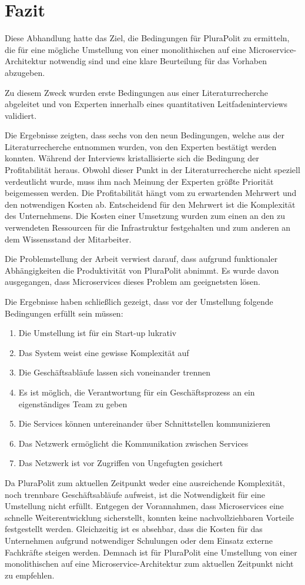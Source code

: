 \section{Fazit}

Diese Abhandlung hatte das Ziel, die Bedingungen für PluraPolit zu ermitteln, die für eine mögliche Umstellung von einer monolithischen auf eine Microservice-Architektur notwendig sind und eine klare Beurteilung für das Vorhaben abzugeben. 
 
 Zu diesem Zweck wurden erste Bedingungen aus einer Literaturrecherche abgeleitet und von Experten innerhalb eines quantitativen Leitfadeninterviews validiert.

Die Ergebnisse zeigten, dass sechs von den neun Bedingungen, 
welche aus der Literaturrecherche entnommen wurden, von den Experten bestätigt werden konnten. Während der Interviews kristallisierte sich die Bedingung der Profitabilität heraus. Obwohl dieser Punkt in der Literaturrecherche nicht speziell verdeutlicht wurde, muss ihm nach Meinung der Experten größte Priorität beigemessen werden. Die Profitabilität hängt vom zu erwartenden Mehrwert und den notwendigen Kosten ab. Entscheidend für den Mehrwert ist die Komplexität des Unternehmens. Die Kosten einer Umsetzung wurden zum einen an den zu verwendeten Ressourcen für die Infrastruktur festgehalten und zum anderen an dem Wissensstand der Mitarbeiter.

Die Problemstellung der Arbeit verwiest darauf, dass aufgrund funktionaler Abhängigkeiten die Produktivität von PluraPolit abnimmt. Es wurde davon ausgegangen, dass Microservices dieses Problem am geeignetsten lösen.
 
Die Ergebnisse haben schließlich gezeigt, dass vor der Umstellung folgende Bedingungen erfüllt sein müssen:
\begin{enumerate}
	\item Die Umstellung ist für ein Start-up lukrativ
	\item Das System weist eine gewisse Komplexität auf
	\item Die Geschäftsabläufe lassen sich voneinander trennen
	\item Es ist möglich, die Verantwortung für ein Geschäftsprozess an ein eigenständiges Team zu geben
	\item Die Services können untereinander über Schnittstellen kommunizieren
	\item Das Netzwerk ermöglicht die Kommunikation zwischen Services
	\item Das Netzwerk ist vor Zugriffen von Ungefugten gesichert
\end{enumerate}

Da PluraPolit zum aktuellen Zeitpunkt weder eine ausreichende Komplexität, noch trennbare Geschäftsabläufe aufweist, ist die Notwendigkeit für eine Umstellung nicht erfüllt. Entgegen der Vorannahmen, dass Microservices eine schnelle Weiterentwicklung sicherstellt, konnten keine nachvollziehbaren Vorteile festgestellt werden. Gleichzeitig ist es absehbar, dass die Kosten für das Unternehmen aufgrund notwendiger Schulungen oder dem Einsatz externe Fachkräfte steigen werden. Demnach ist für PluraPolit eine Umstellung von einer monolithischen auf eine Microservice-Architektur zum aktuellen Zeitpunkt nicht zu empfehlen.
